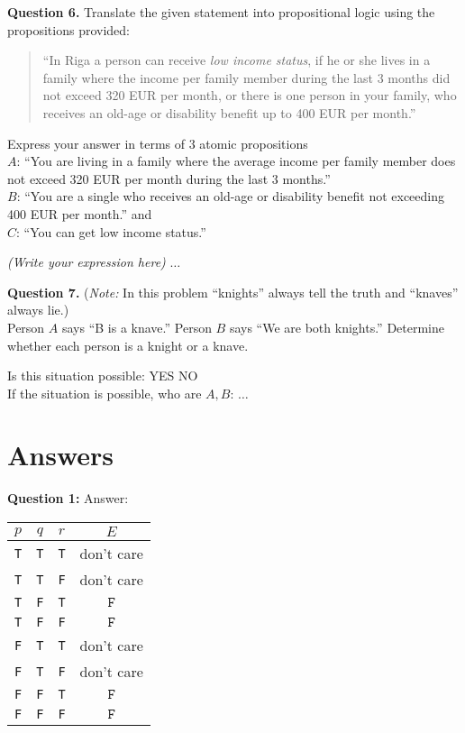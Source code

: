 \documentclass[jou]{apa6}
\begin{document}
\vspace{10pt}
{\bf Question 6.}
Translate the given statement into propositional logic using the propositions provided:
\begin{quote}
``In Riga a person can receive {\em low income status}, 
if he or she lives in a family where the income per family member during the last 3 months did not exceed 320 EUR per month, 
or there is one person in your family, who receives an old-age or disability benefit up to 400 EUR per month.''\\
\end{quote}
Express your answer in terms of $3$ atomic propositions\\
$A$: ``You are living in a family where the average income per family member does not exceed 320 EUR per month during
the last $3$ months.''\\
$B$: ``You are a single who receives an old-age or disability benefit not exceeding 400 EUR per month.'' and\\
$C$: ``You can get low income status.''

\vspace{3pt}
\noindent
{\em (Write your expression here)} $\ldots$


\vspace{10pt}
{\bf Question 7.} 
({\em Note:} In this problem ``knights'' always tell the truth and ``knaves'' always lie.)\\
Person $A$ says ``B is a knave.''
Person $B$ says ``We are both knights.'' Determine whether each person is a knight or a knave.

\vspace{3pt}
\noindent
Is this situation possible: \hspace{5ex} YES \hspace{5ex} NO\\
If the situation is possible, who are $A,B$: $\ldots$

\newpage

\section{Answers}



\noindent
{\bf Question 1:} Answer:

\begin{tabular}{ c | c | c | c }
$p$ & $q$ & $r$ & $E$ \\ \hline
{\tt T} & {\tt T} & {\tt T} & don't care \\ \hline
{\tt T} & {\tt T} & {\tt F} & don't care \\ \hline
{\tt T} & {\tt F} & {\tt T} & $\boxed{\mathtt{F}}$  \\ \hline
{\tt T} & {\tt F} & {\tt F} & $\boxed{\mathtt{F}}$  \\ \hline
{\tt F} & {\tt T} & {\tt T} & don't care \\ \hline
{\tt F} & {\tt T} & {\tt F} & don't care \\ \hline
{\tt F} & {\tt F} & {\tt T} & $\boxed{\mathtt{F}}$  \\ \hline
{\tt F} & {\tt F} & {\tt F} & $\boxed{\mathtt{F}}$  \\ \hline
\end{tabular}
\end{document}
